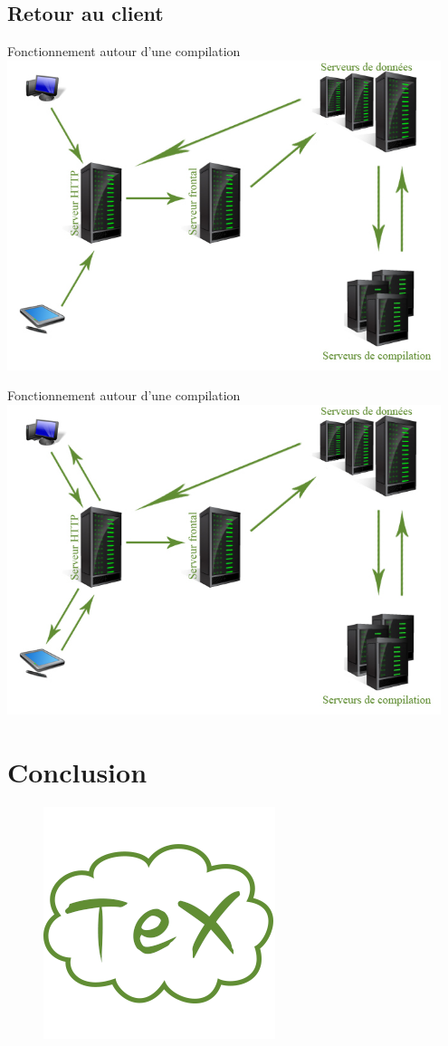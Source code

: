 \documentclass{beamer}
\begin{document}
\subsection{Retour au client}
\begin{frame}{Fonctionnement autour d'une compilation}
 	\includegraphics[width=0.95\textwidth]{./images/step9}
\end{frame}
\begin{frame}{Fonctionnement autour d'une compilation}
 	\includegraphics[width=0.95\textwidth]{./images/step10}
\end{frame}

\section{Conclusion}
\begin{frame}
 \begin{figure}
  	\includegraphics[scale=0.7]{./images/logoTexloud}
	\centering
 \end{figure}

\end{frame}
\end{document}
